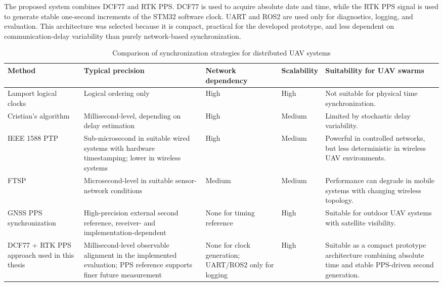 The proposed system combines DCF77 and RTK PPS. DCF77 is used to acquire absolute date and time, while the RTK PPS signal is used to generate stable one-second increments of the STM32 software clock. UART and ROS2 are used only for diagnostics, logging, and evaluation. This architecture was selected because it is compact, practical for the developed prototype, and less dependent on communication-delay variability than purely network-based synchronization.

\begin{table}[htbp]
\centering
\small
\caption{Comparison of synchronization strategies for distributed UAV systems}
\label{tab:syncComparison}
\begin{tabular}{|
>{\raggedright\arraybackslash}p{2.5cm}|
>{\raggedright\arraybackslash}p{3.0cm}|
>{\raggedright\arraybackslash}p{2.3cm}|
>{\raggedright\arraybackslash}p{2.0cm}|
>{\raggedright\arraybackslash}p{3.5cm}|
}
\hline
\textbf{Method} & \textbf{Typical precision} & \textbf{Network dependency} & \textbf{Scalability} & \textbf{Suitability for UAV swarms} \\
\hline
Lamport logical clocks \cite{lamport1978time} 
& Logical ordering only 
& High 
& High 
& Not suitable for physical time synchronization. \\
\hline
Cristian's algorithm \cite{cristian1989probabilistic} 
& Millisecond-level, depending on delay estimation 
& High 
& Medium 
& Limited by stochastic delay variability. \\
\hline
IEEE 1588 PTP \cite{ieee1588} 
& Sub-microsecond in suitable wired systems with hardware timestamping; lower in wireless systems 
& High 
& Medium 
& Powerful in controlled networks, but less deterministic in wireless UAV environments. \\
\hline
FTSP \cite{maroti2004ftsp} 
& Microsecond-level in suitable sensor-network conditions 
& Medium 
& Medium 
& Performance can degrade in mobile systems with changing wireless topology. \\
\hline
GNSS PPS synchronization \cite{teunissen2017springer} 
& High-precision external second reference, receiver- and implementation-dependent 
& None for timing reference 
& High 
& Suitable for outdoor UAV systems with satellite visibility. \\
\hline
DCF77 + RTK PPS approach used in this thesis \cite{ptbDcf77,teunissen2017springer} 
& Millisecond-level observable alignment in the implemented evaluation; PPS reference supports finer future measurement 
& None for clock generation; UART/ROS2 only for logging 
& High 
& Suitable as a compact prototype architecture combining absolute time and stable PPS-driven second generation. \\
\hline
\end{tabular}
\end{table}

